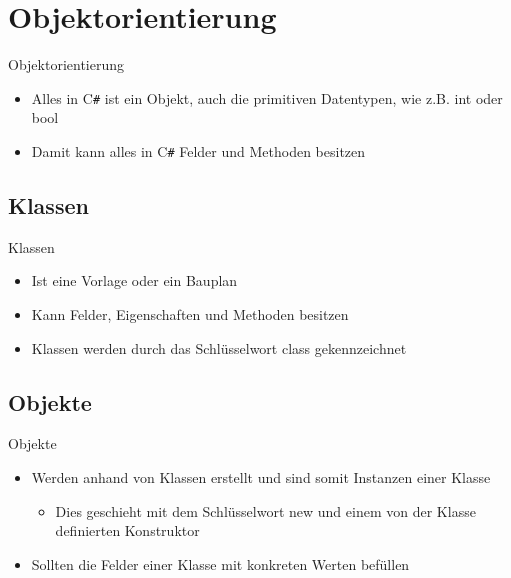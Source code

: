 \section{Objektorientierung}
\begin{frame}{Objektorientierung}
	\begin{itemize}
		\item Alles in C\texttt{\#} ist ein Objekt, auch die primitiven Datentypen, wie z.B. \alert{int} oder \alert{bool}
		\item Damit kann alles in C\texttt{\#} Felder und Methoden besitzen		
	\end{itemize}
\end{frame}

\subsection{Klassen}
\begin{frame}{Klassen}
	\begin{itemize}
		\item Ist eine Vorlage oder ein Bauplan
		\item Kann Felder, Eigenschaften und Methoden besitzen
		\item Klassen werden durch das Schlüsselwort \alert{class} gekennzeichnet
	\end{itemize}	
	
\end{frame}

\subsection{Objekte}
\begin{frame}{Objekte}
	\begin{itemize}
		\item Werden anhand von Klassen erstellt und sind somit Instanzen einer Klasse
		\begin{itemize}
			\item Dies geschieht mit dem Schlüsselwort \alert{new} und einem von der Klasse definierten Konstruktor
		\end{itemize}
		\item Sollten die Felder einer Klasse mit konkreten Werten befüllen
	\end{itemize}
		
\end{frame}

